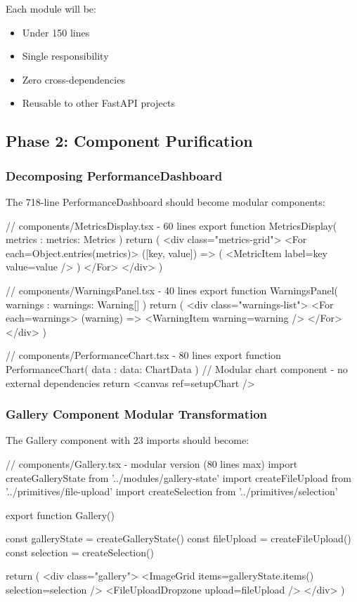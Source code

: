 \documentclass[11pt]{article}
\begin{document}
Each module will be:
\begin{itemize}
\item Under 150 lines
\item Single responsibility
\item Zero cross-dependencies
\item Reusable to other FastAPI projects
\end{itemize}

\subsection{Phase 2: Component Purification}

\subsubsection{Decomposing PerformanceDashboard}

The 718-line PerformanceDashboard should become modular components:

\begin{typescriptcode}
// components/MetricsDisplay.tsx - 60 lines
export function MetricsDisplay({ metrics }: { metrics: Metrics }) {
  return (
    <div class="metrics-grid">
      <For each={Object.entries(metrics)}>
        {([key, value]) => (
          <MetricItem label={key} value={value} />
        )}
      </For>
    </div>
  )
}

// components/WarningsPanel.tsx - 40 lines  
export function WarningsPanel({ warnings }: { warnings: Warning[] }) {
  return (
    <div class="warnings-list">
      <For each={warnings}>
        {(warning) => <WarningItem warning={warning} />}
      </For>
    </div>
  )
}

// components/PerformanceChart.tsx - 80 lines
export function PerformanceChart({ data }: { data: ChartData }) {
  // Modular chart component - no external dependencies
  return <canvas ref={setupChart} />
}
\end{typescriptcode}

\subsubsection{Gallery Component Modular Transformation}

The Gallery component with 23 imports should become:

\begin{typescriptcode}
// components/Gallery.tsx - modular version (80 lines max)
import { createGalleryState } from '../modules/gallery-state'
import { createFileUpload } from '../primitives/file-upload'
import { createSelection } from '../primitives/selection'

export function Gallery() {
  const galleryState = createGalleryState()
  const fileUpload = createFileUpload()
  const selection = createSelection()
  
  return (
    <div class="gallery">
      <ImageGrid
        items={galleryState.items()}
        selection={selection}
      />
      <FileUploadDropzone upload={fileUpload} />
    </div>
  )
}
\end{typescriptcode}
\end{document}
